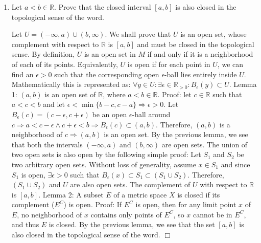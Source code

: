 \documentclass[12pt,letterpaper,reqno]{amsart}
\newcommand{\R}{\mathbb R}
\begin{document}
\begin{enumerate}[1.]
\item Let $a<b\in \R$. Prove that the closed interval $[a,b]$ is also closed in the topological sense of the word.
\begin{flushleft}
Let $U = (-\infty, a) \cup (b, \infty)$. We shall prove that $U$ is an open set, whose complement with respect to $\R$ is $[a,b]$ and must be closed in the topological sense. By definition, $U$ is an open set in $M$ if and only if it is a neighborhood of each of its points. Equivalently, $U$ is open if for each point in $U$, we can find an $\epsilon > 0$ such that the corresponding open $\epsilon$-ball lies entirely inside $U$. Mathematically this is represented as: $\forall y \in U: \exists \epsilon \in \R_{>0}: B_\epsilon(y) \subset U$.
\newline Lemma 1: $(a, b)$ is an open set of $\R$, where $a<b\in \R$.
\newline Proof: let $c \in \R$ such that $a < c < b$ and let $\epsilon < \min \{b-c, c-a\} \Rightarrow \epsilon > 0$. Let $B_\epsilon(c) = (c-\epsilon, c+\epsilon)$ be an open $\epsilon$-ball around $c \Rightarrow a < c-\epsilon \wedge c+\epsilon < b \Rightarrow B_\epsilon(c) \subset (a,b)$. Therefore, $(a,b)$ is a neighborhood of $c \Rightarrow (a,b)$ is an open set.
\newline By the previous lemma, we see that both the intervals $(-\infty, a)$ and $(b, \infty)$ are open sets. The union of two open sets is also open by the following simple proof: Let $S_1$ and $S_2$ be two arbitrary open sets. Without loss of generality, assume $x \in S_1$ and since $S_1$ is open, $\exists \epsilon > 0$ such that $B_\epsilon(x) \subset S_1 \subset (S_1 \cup S_2)$. Therefore, $(S_1 \cup S_2)$ and $U$ are also open sets. The complement of $U$ with respect to $\R$ is $[a,b]$.
\newline Lemma 2: A subset $E$ of a metric space $X$ is closed if its complement ($E^C$) is open.
\newline Proof: If $E^C$ is open, then for any limit point $x$ of $E$, no neighborhood of $x$ contains only points of $E^C$, so $x$ cannot be in $E^C$, and thus $E$ is closed.
\newline By the previous lemma, we see that the set $[a,b]$ is also closed in the topological sense of the word. $\Box$
\end{flushleft}


\end{enumerate}
\end{document}
